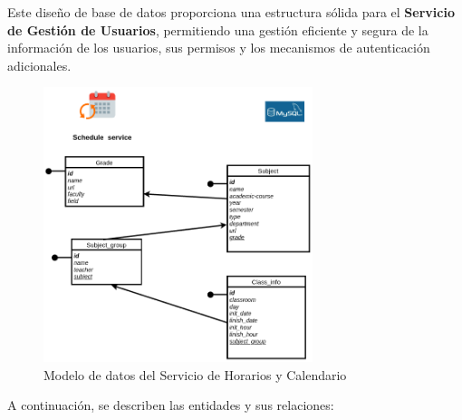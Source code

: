 Este diseño de base de datos proporciona una estructura sólida para el \textbf{Servicio de Gestión de Usuarios}, permitiendo una gestión eficiente y segura de la información de los usuarios, sus permisos y los mecanismos de autenticación adicionales.

\begin{figure}[H]
    \centering
    \includegraphics[width=0.7\textwidth]{figures/06_calendar_db.png}
    \caption{Modelo de datos del Servicio de Horarios y Calendario}
    \label{fig:schedule_service_er}
\end{figure}

A continuación, se describen las entidades y sus relaciones:

